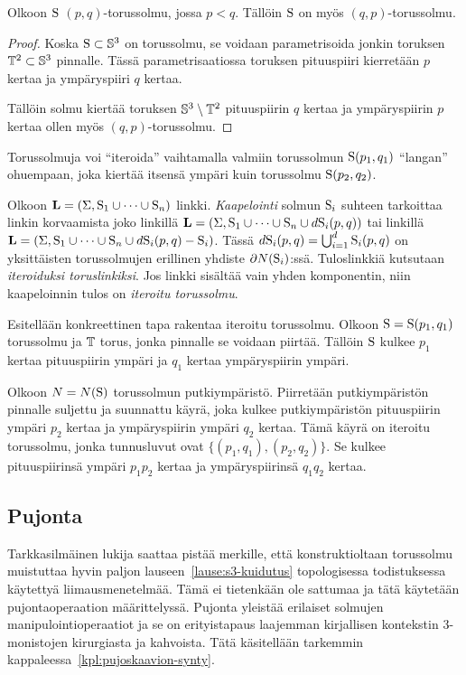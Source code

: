 \begin{lemma}
    Olkoon $\text{S}$ $(p,q)$-torussolmu, jossa $p<q$. Tällöin $\text{S}$ on myös $(q,p)$-torussolmu.
    \label{lemma:pq-torussolmu-on-qp}
\end{lemma}
\begin{proof}
    Koska $\text{S}\subset\mathbb{S}^3$ on torussolmu, se voidaan parametrisoida jonkin toruksen $\mathbb{T}^2\subset\mathbb{S}^3$ pinnalle. Tässä parametrisaatiossa toruksen pituuspiiri kierretään $p$ kertaa ja ympäryspiiri $q$ kertaa.

    Tällöin solmu kiertää toruksen $\mathbb{S}^3\setminus\mathbb{T}^2$ pituuspiirin $q$ kertaa ja ympäryspiirin $p$ kertaa ollen myös $(q,p)$-torussolmu.
\end{proof}
Torussolmuja voi ``iteroida'' vaihtamalla valmiin torussolmun $\text{S}(p_1,q_1)$ ``langan'' ohuempaan, joka kiertää itsensä ympäri kuin torussolmu $\text{S}(p_2,q_2)$.
\begin{maaritelma}
    Olkoon $\mathbf{L}=(\Sigma,\text{S}_1\cup\cdots\cup\text{S}_n)$ linkki. \emph{Kaapelointi} solmun $\text{S}_i$ suhteen tarkoittaa linkin korvaamista joko linkillä $\mathbf{L}=(\Sigma,\text{S}_1\cup\cdots\cup\text{S}_n\cup d\text{S}_i(p,q))$ tai linkillä $\mathbf{L}=(\Sigma,\text{S}_1\cup\cdots\cup\text{S}_n\cup d\text{S}_i(p,q)-\text{S}_i)$. Tässä $d\text{S}_i(p,q)=\bigcup_{i=1}^d\text{S}_i(p,q)$ on yksittäisten torussolmujen erillinen yhdiste $\partial N(\text{S}_i)$:ssä. Tuloslinkkiä kutsutaan \emph{iteroiduksi toruslinkiksi}. Jos linkki sisältää vain yhden komponentin, niin kaapeloinnin tulos on \emph{iteroitu torussolmu}.
\end{maaritelma}
Esitellään konkreettinen tapa rakentaa iteroitu torussolmu. Olkoon $\text{S}=\text{S}(p_1,q_1)$ torussolmu ja $\mathbb{T}$ torus, jonka pinnalle se voidaan piirtää. Tällöin $\text{S}$ kulkee $p_1$ kertaa pituuspiirin ympäri ja $q_1$ kertaa ympäryspiirin ympäri. 

Olkoon $N=N(\text{S})$ torussolmun putkiympäristö. Piirretään putkiympäristön pinnalle suljettu ja suunnattu käyrä, joka kulkee putkiympäristön pituuspiirin ympäri $p_2$ kertaa ja ympäryspiirin ympäri $q_2$ kertaa. Tämä käyrä on iteroitu torussolmu, jonka tunnusluvut ovat $\{(p_1,q_1),(p_2,q_2)\}$. Se kulkee pituuspiirinsä ympäri $p_1p_2$ kertaa ja ympäryspiirinsä $q_1q_2$ kertaa.

\subsection{Pujonta}
Tarkkasilmäinen lukija saattaa pistää merkille, että konstruktioltaan torussolmu muistuttaa hyvin paljon lauseen~\ref{lause:s3-kuidutus} topologisessa todistuksessa käytettyä liimausmenetelmää. Tämä ei tietenkään ole sattumaa ja tätä käytetään pujontaoperaation määrittelyssä. Pujonta yleistää erilaiset solmujen manipulointioperaatiot ja se on erityistapaus laajemman kirjallisen kontekstin 3-monistojen kirurgiasta ja kahvoista. Tätä käsitellään tarkemmin kappaleessa~\ref{kpl:pujoskaavion-synty}.

